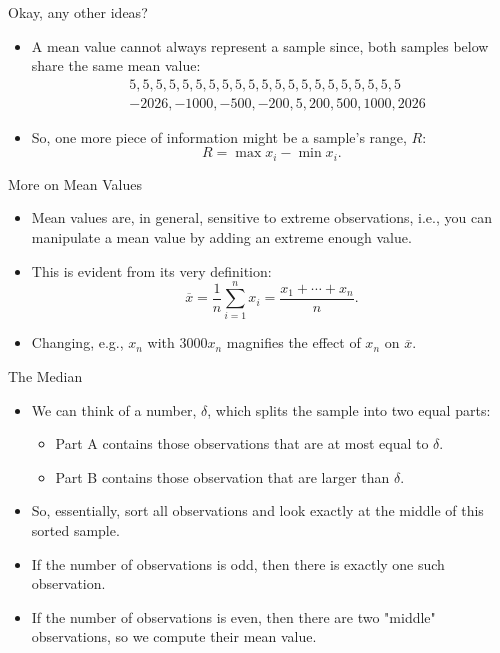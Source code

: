 \documentclass[aspectratio=169, 12pt, xcolor=table]{beamer}
\begin{document}
	\begin{frame}{Okay, any other ideas?}
		\begin{itemize}
			\item A mean value cannot always represent a sample since, both samples below share the same mean value:
			\begin{align*}
				&5, 5, 5, 5, 5, 5, 5, 5, 5, 5, 5, 5, 5, 5, 5, 5, 5, 5, 5, 5, 5\\
				&-2026, -1000, -500, -200, 5, 200, 500, 1000, 2026
			\end{align*}
			\item So, one more piece of information might be a sample's range, $R$:
			\[R=\max x_i-\min x_i.\]
		\end{itemize}
	\end{frame}

	\begin{frame}{More on Mean Values}
		\begin{itemize}
			\item Mean values are, in general, sensitive to extreme observations, i.e., you can manipulate a mean value by adding an extreme enough value.\pause
			\item This is evident from its very definition:
			\[\overline{x}=\frac{1}{n}\sum_{i=1}^nx_i=\frac{x_1+\cdots+x_n}{n}.\]\pause
			\item Changing, e.g., $x_n$ with $3000x_n$ magnifies the effect of $x_n$ on $\overline{x}$.
		\end{itemize}
	\end{frame}

	\begin{frame}{The Median}
		\begin{itemize}
			\item We can think of a number, $\delta$, which splits the sample into two equal parts:
			\begin{itemize}
				\item Part A contains those observations that are at most equal to $\delta$.
				\item Part B contains those observation that are larger than $\delta$.
			\end{itemize}
			\item So, essentially, sort all observations and look exactly at the middle of this sorted sample.
			\item If the number of observations is odd, then there is exactly one such observation.
			\item If the number of observations is even, then there are two "middle" observations, so we compute their mean value.
		\end{itemize}
	\end{frame}
\end{document}
